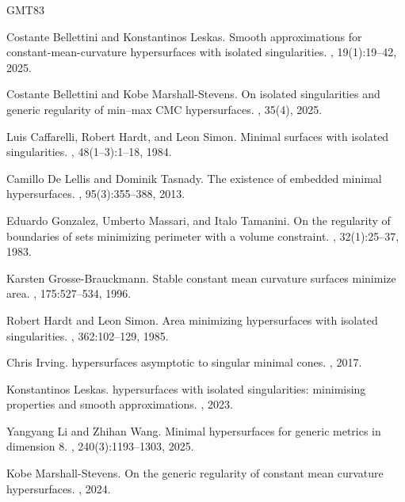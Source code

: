 \documentclass[12pt]{article}
\begin{document}
\begin{thebibliography}{GMT83}

Costante Bellettini and Konstantinos Leskas.
\newblock Smooth approximations for constant-mean-curvature hypersurfaces with
  isolated singularities.
, 19(1):19–42, 2025.

Costante Bellettini and Kobe {Marshall-Stevens}.
\newblock On isolated singularities and generic regularity of min–max {CMC}
  hypersurfaces.
, 35(4), 2025.

Luis Caffarelli, Robert Hardt, and Leon Simon.
\newblock Minimal surfaces with isolated singularities.
, 48(1–3):1–18, 1984.

Camillo {De Lellis} and Dominik Tasnady.
\newblock The existence of embedded minimal hypersurfaces.
, 95(3):355--388, 2013.

Eduardo Gonzalez, Umberto Massari, and Italo Tamanini.
\newblock On the regularity of boundaries of sets minimizing perimeter with a
  volume constraint.
, 32(1):25--37, 1983.

Karsten Gross{e-B}rauckmann.
\newblock Stable constant mean curvature surfaces minimize area.
, 175:527--534, 1996.

Robert Hardt and Leon Simon.
\newblock Area minimizing hypersurfaces with isolated singularities.
,
  362:102--129, 1985.

Chris Irving.
 hypersurfaces asymptotic to singular minimal cones.
, 2017.

Konstantinos Leskas.
 hypersurfaces with isolated singularities: minimising
  properties and smooth approximations.
, 2023.

Yangyang Li and Zhihan Wang.
\newblock Minimal hypersurfaces for generic metrics in dimension 8.
, 240(3):1193–1303, 2025.

Kobe {Marshall-Stevens}.
\newblock On the generic regularity of constant mean curvature hypersurfaces.
, 2024.


\end{thebibliography}
\end{document}
